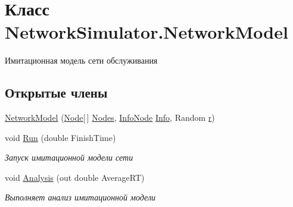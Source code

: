 \hypertarget{class_network_simulator_1_1_network_model}{}\section{Класс Network\+Simulator.\+Network\+Model}
\label{class_network_simulator_1_1_network_model}


Имитационная модель сети обслуживания  


\subsection*{Открытые члены}
\begin{DoxyCompactItemize}
\item 
\hyperlink{class_network_simulator_1_1_network_model_a61dfb38e787f81b16b584c6f311064af}{Network\+Model} (\hyperlink{class_network_simulator_1_1_node}{Node}\mbox{[}$\,$\mbox{]} \hyperlink{class_network_simulator_1_1_network_model_a822a8596ab343f9a22006035fdaf4b6f}{Nodes}, \hyperlink{class_network_simulator_1_1_info_node}{Info\+Node} \hyperlink{class_network_simulator_1_1_network_model_ad855627388c67befd2c4c736a87fa84d}{Info}, Random \hyperlink{class_network_simulator_1_1_network_model_aaeac879328213fb50bce2e4c44368ecf}{r})
\item 
void \hyperlink{class_network_simulator_1_1_network_model_a79f12b7c4dc35f16f98bf59e06341e79}{Run} (double Finish\+Time)
\begin{DoxyCompactList}\small\item\em Запуск имитационной модели сети \end{DoxyCompactList}\item 
void \hyperlink{class_network_simulator_1_1_network_model_ab2526f51714e4ead297180cc391449a2}{Analysis} (out double Average\+RT)
\begin{DoxyCompactList}\small\item\em Выполняет анализ имитационной модели \end{DoxyCompactList}\end{DoxyCompactItemize}
